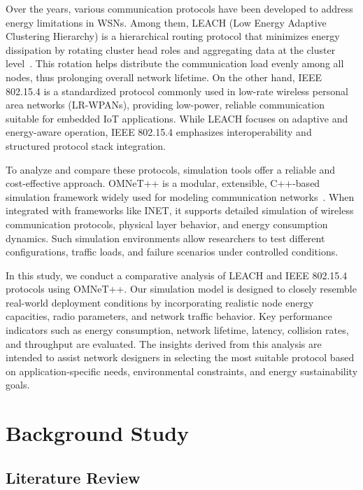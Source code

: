 \documentclass[conference]{IEEEtran}
\begin{document}
Over the years, various communication protocols have been developed to address energy limitations in WSNs. Among them, LEACH (Low Energy Adaptive Clustering Hierarchy) is a hierarchical routing protocol that minimizes energy dissipation by rotating cluster head roles and aggregating data at the cluster level~\cite{leach_journal}. This rotation helps distribute the communication load evenly among all nodes, thus prolonging overall network lifetime. On the other hand, IEEE 802.15.4 is a standardized protocol commonly used in low-rate wireless personal area networks (LR-WPANs), providing low-power, reliable communication suitable for embedded IoT applications. While LEACH focuses on adaptive and energy-aware operation, IEEE 802.15.4 emphasizes interoperability and structured protocol stack integration.

To analyze and compare these protocols, simulation tools offer a reliable and cost-effective approach. OMNeT++ is a modular, extensible, C++-based simulation framework widely used for modeling communication networks~\cite{omnet_ref}. When integrated with frameworks like INET, it supports detailed simulation of wireless communication protocols, physical layer behavior, and energy consumption dynamics. Such simulation environments allow researchers to test different configurations, traffic loads, and failure scenarios under controlled conditions.

In this study, we conduct a comparative analysis of LEACH and IEEE 802.15.4 protocols using OMNeT++. Our simulation model is designed to closely resemble real-world deployment conditions by incorporating realistic node energy capacities, radio parameters, and network traffic behavior. Key performance indicators such as energy consumption, network lifetime, latency, collision rates, and throughput are evaluated. The insights derived from this analysis are intended to assist network designers in selecting the most suitable protocol based on application-specific needs, environmental constraints, and energy sustainability goals.



\section{Background Study}

\subsection{Literature Review}
\end{document}
